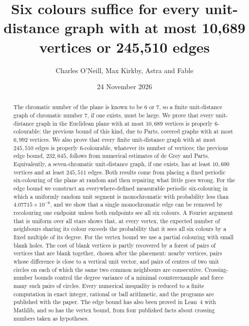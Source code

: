\documentclass[11pt,colorlinks]{charlie}
\title{Six colours suffice for every unit-distance graph with at most 10{,}689 vertices or 245{,}510 edges}
\author{Charles O'Neill, Max Kirkby, Astra and Fable}
\date{24 November 2026}
\begin{document}
\maketitle

\begin{abstract}
The chromatic number of the plane is known to be $6$ or $7$, so a finite unit-distance graph of chromatic number $7$, if one exists, must be large. We prove that every unit-distance graph in the Euclidean plane with at most $10{,}689$ vertices is properly $6$-colourable; the previous bound of this kind, due to Parts, covered graphs with at most $6{,}992$ vertices. We also prove that every finite unit-distance graph with at most $245{,}510$ edges is properly $6$-colourable, whatever its number of vertices; the previous edge bound, $232{,}645$, follows from numerical estimates of de Grey and Parts. Equivalently, a seven-chromatic unit-distance graph, if one exists, has at least $10{,}690$ vertices and at least $245{,}511$ edges. Both results come from placing a fixed periodic six-colouring of the plane at random and then repairing what little goes wrong. For the edge bound we construct an everywhere-defined measurable periodic six-colouring in which a uniformly random unit segment is monochromatic with probability less than $4.07715\times10^{-6}$, and we show that a single monochromatic edge can be removed by recolouring one endpoint unless both endpoints see all six colours. A Fourier argument that is uniform over all stars shows that, at every vertex, the expected number of neighbours sharing its colour exceeds the probability that it sees all six colours by a fixed multiple of its degree. For the vertex bound we use a partial colouring with small blank holes. The cost of blank vertices is partly recovered by a forest of pairs of vertices that are blank together, chosen after the placement: nearby vertices, pairs whose difference is close to a vertical unit vector, and pairs of centres of two unit circles on each of which the same two common neighbours are consecutive. Crossing-number bounds control the degree variance of a minimal counterexample and force many such pairs of circles. Every numerical inequality is reduced to a finite computation in exact integer, rational or ball arithmetic, and the programs are published with the paper. The edge bound has also been proved in Lean~4 with Mathlib, and so has the vertex bound, from four published facts about crossing numbers taken as hypotheses.
\end{abstract}
\end{document}
